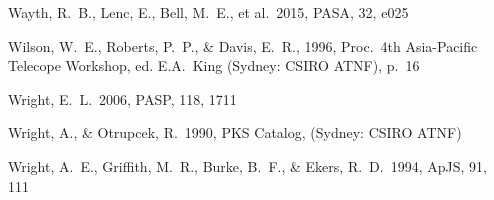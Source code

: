 \documentclass{pasa}%
\begin{document}
\begin{thebibliography}{}
Wayth, R.~B., Lenc, E., Bell, M.~E., et al.\ 2015, PASA, 32, e025 

Wilson, W.~E., Roberts, P.~P., \& Davis, E.~R., 1996, Proc.\ 4th Asia-Pacific Telecope Workshop, 
ed. E.A.~King (Sydney: CSIRO ATNF), p.\ 16

Wright, E.~L.\ 2006, PASP, 118, 1711 

Wright, A., \& Otrupcek, R.\ 1990, PKS Catalog, (Sydney: CSIRO ATNF)  

Wright, A.~E., Griffith, M.~R., Burke, B.~F., \& Ekers, R.~D.\ 1994, ApJS, 91, 111 

\end{thebibliography}
\end{document}
